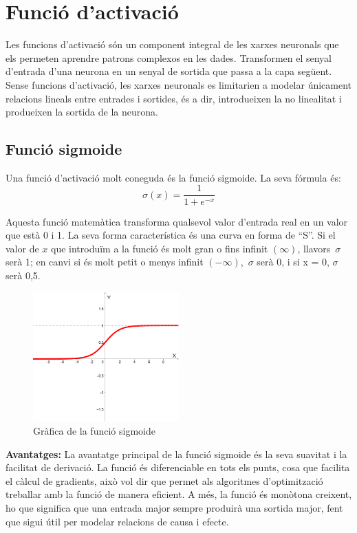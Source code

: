 {\section{
Funció d'activació}\label{sec:3.5.3}
Les funcions d'activació són un component integral de les xarxes neuronals que els permeten aprendre patrons complexos en les dades. Transformen el senyal d'entrada d'una neurona en un senyal de sortida que passa a la capa següent. Sense funcions d'activació, les xarxes neuronals es limitarien a modelar únicament relacions lineals entre entrades i sortides, és a dir, introdueixen la no linealitat i produeixen la sortida de la neurona.

\subsection{Funció sigmoide}\label{3.7.1}
Una funció d'activació molt coneguda és la funció sigmoide. La seva fórmula és:
\[ \sigma(x) = \frac{1}{1 + e^{-x}} \]

Aquesta funció matemàtica transforma qualsevol valor d'entrada real en un valor que està 0 i 1. La seva forma característica és una curva en forma de ``S''. Si el valor de $x$ que introduïm a la funció és molt gran o fins infinit $(\infty)$, llavors\ $\sigma$ serà 1; en canvi si és molt petit o menys infinit $(-\infty)$,\ $\sigma$ serà 0, i si x = 0,  $\sigma$  serà 0,5.

\begin{figure}[h!]
    \centering
    \includegraphics[width=0.5\textwidth]{./figures/grafica_sigmoide.png}
    \caption{Gràfica de la funció sigmoide}
\end{figure}

\textbf{Avantatges:}
La avantatge principal de la funció sigmoide és la seva suavitat i la facilitat de derivació. La funció és diferenciable en tots els punts, cosa que facilita el càlcul de gradients, això vol dir que permet als algoritmes d'optimització treballar amb la funció de manera eficient. A més, la funció és monòtona creixent, ho que significa que una entrada major sempre produirà una sortida major, fent que sigui útil per modelar relacions de causa i efecte.

}
